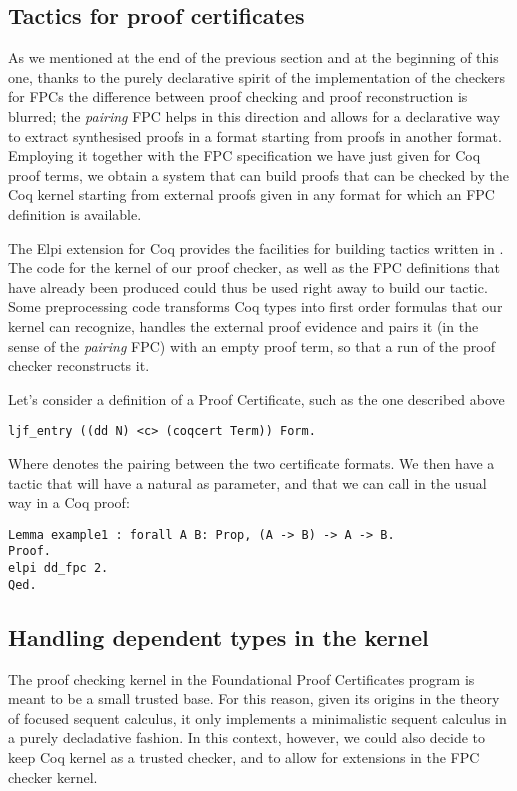 \documentclass{llncs}
\begin{document}
{\subsection{Tactics for proof certificates}
As we mentioned at the end of the previous section and at the beginning of 
this one, thanks to the purely declarative spirit of the implementation
of the checkers for FPCs the difference between proof checking and proof
reconstruction is blurred; the \emph{pairing} FPC helps in this direction
and allows for a declarative way to extract synthesised proofs in a format
starting from proofs in another format. Employing it together with the FPC
specification we have just given for Coq proof terms, we obtain a system
that can build proofs that can be checked by the Coq kernel starting from
external proofs given in any format for which an FPC definition is available.

The Elpi extension for Coq provides the facilities for building tactics
written in \lP. The code for the kernel of our proof checker, as well
as the FPC definitions that have already been produced could thus be
used right away to build our tactic. Some preprocessing code transforms Coq
types into first order formulas that our kernel can recognize,
handles the external proof evidence and pairs it (in the sense of the
\emph{pairing} FPC) with an empty proof term,
so that a run of the proof checker reconstructs it.

Let's consider a definition of a Proof Certificate, such as the one described above
\small{
  \begin{lstlisting}
ljf_entry ((dd N) <c> (coqcert Term)) Form.
  \end{lstlisting}
}
Where  denotes the pairing between the two certificate formats.
We then have a tactic that will have a natural as parameter, and that we can call in 
the usual way in a Coq proof:
\small{
  \begin{lstlisting}
Lemma example1 : forall A B: Prop, (A -> B) -> A -> B.
Proof.
elpi dd_fpc 2.
Qed.
  \end{lstlisting}
}

\subsection{Handling dependent types in the kernel}
The proof checking kernel in the Foundational Proof Certificates program is
meant to be a small trusted base. For this reason, given its origins in the
theory of focused sequent calculus, it only implements a minimalistic
sequent calculus in a purely decladative fashion.
In this context, however, we could also decide to keep Coq kernel as a trusted checker,
and to allow for extensions in the FPC checker kernel.

}
\end{document}
